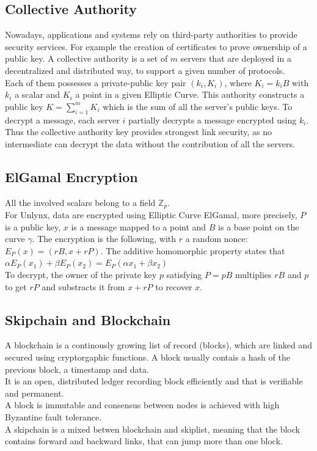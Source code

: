 \documentclass{article}
\begin{document}
\subsection{Collective Authority}
Nowadays, applications and systems rely on third-party authorities to provide security services. For example the creation of certificates to prove ownership of a public key. A collective authority is a set of $m$  servers that are deployed in a decentralized and distributed way, to support a given number of protocols.\\
Each of them possesses a private-public key pair $(k_i,K_i)$, where $K_i = k_i B$ with $k_i$ a scalar and $K_i$ a point in a given Elliptic Curve. This authority constructs a public key $K = \sum_{i=1}^{m}{K_i}$ which is the sum of all the server's public keys. To decrypt a message, each server $i$ partially decrypts a message encrypted using $k_{i}$. Thus the collective authority key provides strongest link security, as no intermediate can decrypt the data without the contribution of all the servers.

\subsection{ElGamal Encryption}
All the involved scalars belong to a field $\mathbb{Z}_p$.\\
For Unlynx, data are encrypted using Elliptic Curve ElGamal, more precisely, $P$ is a public key, $x$ is a message mapped to a point and $B$ is a base point on the curve $\gamma$. The encryption is the following, with $r$ a random nonce:\\
$E_P(x) = (rB,x+rP)$. The additive homomorphic property states that $\alpha E_P(x_1) + \beta E_P(x_2) = E_P(\alpha x_1+ \beta x_2)$\\
To decrypt, the owner of the private key $p$ satisfying $P = pB$ multiplies $rB$ and $p$ to get $rP$ and substracts it from $x + rP$ to recover $x$.\\

\subsection{Skipchain and Blockchain}
A blockchain is a continously growing list of record (blocks), which are linked and secured using cryptorgaphic functions. A block usually contais a hash of the previous block, a timestamp and data.\\
It is an open, distributed ledger recording block efficiently and that is verifiable and permanent.\\
A block is immutable and consensus between nodes is achieved with high Byzantine fault tolerance.\\
A skipchain is a mixed betwen blockchain and skiplist, meaning that the block contains forward and backward links, that can jump more than one block.\\
\end{document}
